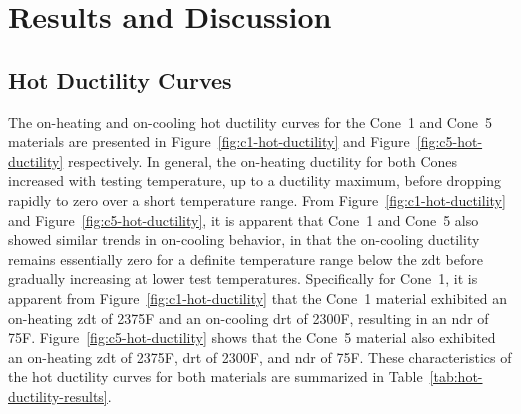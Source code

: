 \chapter{Results and Discussion} \label{ch:results-discussion}

\section{Hot Ductility Curves}
The on-heating and on-cooling hot ductility curves for the Cone~1 and Cone~5 materials are presented in Figure~\ref{fig:c1-hot-ductility} and Figure~\ref{fig:c5-hot-ductility} respectively.  In general, the on-heating ductility for both Cones increased with testing temperature, up to a ductility maximum, before dropping rapidly to zero over a short temperature range.  From Figure~\ref{fig:c1-hot-ductility} and Figure~\ref{fig:c5-hot-ductility}, it is apparent that Cone~1 and Cone~5 also showed similar trends in on-cooling behavior, in that the on-cooling ductility remains essentially zero for a definite temperature range below the \gls{zdt} before gradually increasing at lower test temperatures.  Specifically for Cone~1, it is apparent from Figure~\ref{fig:c1-hot-ductility} that the Cone~1 material exhibited an on-heating \gls{zdt} of 2375\textdegree{}F and an on-cooling \gls{drt} of 2300\textdegree{}F, resulting in an \gls{ndr} of 75F\textdegree{}.  Figure~\ref{fig:c5-hot-ductility} shows that the Cone~5 material also exhibited an on-heating \gls{zdt} of 2375\textdegree{}F, \gls{drt} of 2300\textdegree{}F, and \gls{ndr} of 75F\textdegree{}.  These characteristics of the hot ductility curves for both materials are summarized in Table~\ref{tab:hot-ductility-results}.

